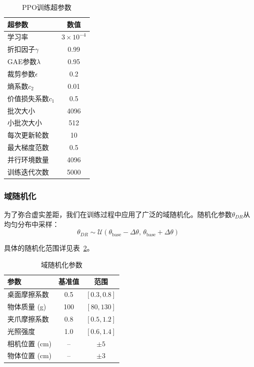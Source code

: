 \begin{table}[!t]
\renewcommand{\arraystretch}{1.3}
\caption{PPO训练超参数}
\label{tab:hyperparameters}
\centering
\begin{tabular}{lc}
\hline\hline
\textbf{超参数} & \textbf{数值} \\ \hline
学习率 & $3 \times 10^{-4}$ \\
折扣因子$\gamma$ & 0.99 \\
GAE参数$\lambda$ & 0.95 \\
裁剪参数$\epsilon$ & 0.2 \\
熵系数$c_2$ & 0.01 \\
价值损失系数$c_1$ & 0.5 \\
批次大小 & 4096 \\
小批次大小 & 512 \\
每次更新轮数 & 10 \\
最大梯度范数 & 0.5 \\
并行环境数量 & 4096 \\
训练迭代次数 & 5000 \\ \hline\hline
\end{tabular}
\end{table}

\subsubsection{域随机化}
\label{subsec:domain_randomization}

为了弥合虚实差距，我们在训练过程中应用了广泛的域随机化。随机化参数$\theta_{DR}$从均匀分布中采样：
\begin{equation}
    \theta_{DR} \sim \mathcal{U}(\theta_{\text{base}} - \Delta\theta, \, \theta_{\text{base}} + \Delta\theta)
\end{equation}

具体的随机化范围详见表~\ref{tab:domain_randomization}。

\begin{table}[!t]
\renewcommand{\arraystretch}{1.3}
\caption{域随机化参数}
\label{tab:domain_randomization}
\centering
\begin{tabular}{lcc}
\hline\hline
\textbf{参数} & \textbf{基准值} & \textbf{范围} \\ \hline
桌面摩擦系数 & 0.5 & $[0.3, 0.8]$ \\
物体质量 (g) & 100 & $[80, 130]$ \\
夹爪摩擦系数 & 0.8 & $[0.5, 1.2]$ \\
光照强度 & 1.0 & $[0.6, 1.4]$ \\
相机位置 (cm) & -- & $\pm 5$ \\
物体位置 (cm) & -- & $\pm 3$ \\ \hline\hline
\end{tabular}
\end{table}

